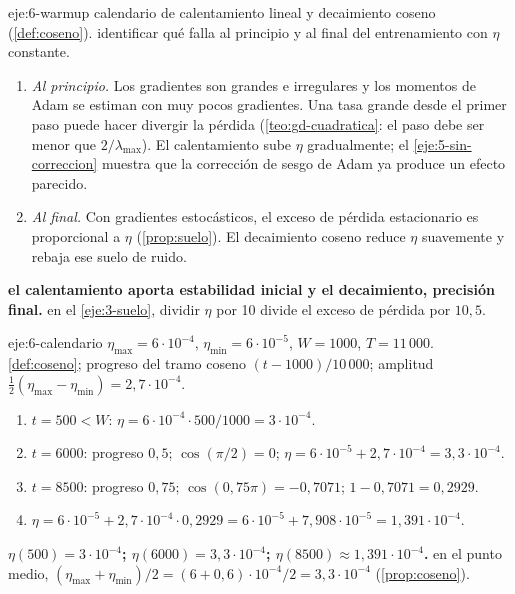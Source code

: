 \begin{solucion}{eje:6-warmup}
\datos calendario de calentamiento lineal y decaimiento coseno (\cref{def:coseno}).
\planteamiento identificar qué falla al principio y al final del entrenamiento con $\eta$ constante.
\pasos
\begin{enumerate}[label=\arabic*.]
  \item \emph{Al principio.} Los gradientes son grandes e irregulares y los momentos de Adam se estiman con muy pocos gradientes. Una tasa grande desde el primer paso puede hacer divergir la pérdida (\cref{teo:gd-cuadratica}: el paso debe ser menor que $2/\lambda_{\max}$). El calentamiento sube $\eta$ gradualmente; el \cref{eje:5-sin-correccion} muestra que la corrección de sesgo de Adam ya produce un efecto parecido.
  \item \emph{Al final.} Con gradientes estocásticos, el exceso de pérdida estacionario es proporcional a $\eta$ (\cref{prop:suelo}). El decaimiento coseno reduce $\eta$ suavemente y rebaja ese suelo de ruido.
\end{enumerate}
\resultado \textbf{el calentamiento aporta estabilidad inicial y el decaimiento, precisión final.}
\comprobacion en el \cref{eje:3-suelo}, dividir $\eta$ por 10 divide el exceso de pérdida por $10{,}5$.
\end{solucion}

\begin{solucion}{eje:6-calendario}
\datos $\eta_{\max}=6\cdot 10^{-4}$, $\eta_{\min}=6\cdot 10^{-5}$, $W=1000$, $T=11\,000$.
\planteamiento \cref{def:coseno}; progreso del tramo coseno $(t-1000)/10\,000$; amplitud $\frac12(\eta_{\max}-\eta_{\min})=2{,}7\cdot 10^{-4}$.
\pasos
\begin{enumerate}[label=\arabic*.]
  \item $t=500<W$: $\eta=6\cdot 10^{-4}\cdot 500/1000=3\cdot 10^{-4}$.
  \item $t=6000$: progreso $0{,}5$; $\cos(\pi/2)=0$; $\eta=6\cdot 10^{-5}+2{,}7\cdot 10^{-4}=3{,}3\cdot 10^{-4}$.
  \item $t=8500$: progreso $0{,}75$; $\cos(0{,}75\pi)=-0{,}7071$; $1-0{,}7071=0{,}2929$.
  \item $\eta=6\cdot 10^{-5}+2{,}7\cdot 10^{-4}\cdot 0{,}2929=6\cdot 10^{-5}+7{,}908\cdot 10^{-5}=1{,}391\cdot 10^{-4}$.
\end{enumerate}
\resultado \textbf{$\eta(500)=3\cdot 10^{-4}$; $\eta(6000)=3{,}3\cdot 10^{-4}$; $\eta(8500)\approx 1{,}391\cdot 10^{-4}$.}
\comprobacion en el punto medio, $(\eta_{\max}+\eta_{\min})/2=(6+0{,}6)\cdot 10^{-4}/2=3{,}3\cdot 10^{-4}$ (\cref{prop:coseno}).
\end{solucion}

